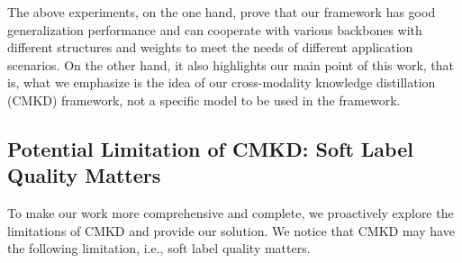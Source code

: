 \documentclass[runningheads]{llncs}
\begin{document}
\begin{table}[t]
    \small
    \centering
        \caption{Generalization study of CMKD using backbones with different weights and different structures.}
    \label{tab:differentbackbone}
\end{table}


The above experiments, on the one hand, prove that our framework has good generalization performance and can cooperate with various backbones with different structures and weights to meet the needs of different application scenarios. 
On the other hand, it also highlights our main point of this work, that is,
what we emphasize is the idea of our cross-modality knowledge distillation (CMKD) framework, not a specific model to be used in the framework.

\subsection{Potential Limitation of CMKD: Soft Label Quality Matters}
\label{sec:limitation}
To make our work more comprehensive and complete, we proactively explore the limitations of CMKD and provide our solution. 
We notice that CMKD may have the following limitation, i.e., soft label quality matters.
\end{document}
